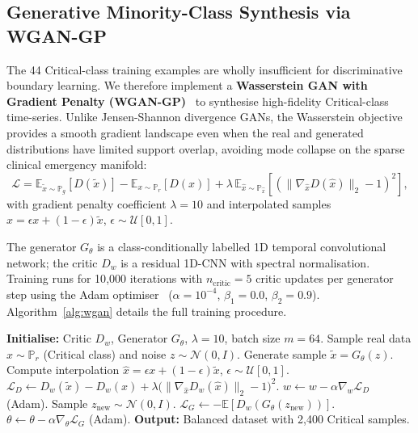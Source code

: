 \documentclass[conference]{IEEEtran}
\begin{document}
\subsection{Generative Minority-Class Synthesis via WGAN-GP}
The 44 Critical-class training examples are wholly insufficient for
discriminative boundary learning.  We therefore implement a
\textbf{Wasserstein GAN with Gradient Penalty (WGAN-GP)}~\cite{b2,b8}
to synthesise high-fidelity Critical-class time-series.  Unlike
Jensen-Shannon divergence GANs, the Wasserstein objective provides a
smooth gradient landscape even when the real and generated
distributions have limited support overlap, avoiding mode collapse on
the sparse clinical emergency manifold:
\begin{equation}
  \mathcal{L} = \mathbb{E}_{\tilde{x}\sim\mathbb{P}_g}[D(\tilde{x})]
    - \mathbb{E}_{x\sim\mathbb{P}_r}[D(x)]
    + \lambda\,\mathbb{E}_{\hat{x}\sim\mathbb{P}_{\hat{x}}}
      \!\left[\left(\|\nabla_{\hat{x}}D(\hat{x})\|_2 - 1\right)^2\right],
  \label{eq:wgan}
\end{equation}
with gradient penalty coefficient $\lambda = 10$ and interpolated
samples $\hat{x} = \epsilon x + (1-\epsilon)\tilde{x}$,
$\epsilon \sim \mathcal{U}[0,1]$.

The generator $G_\theta$ is a class-conditionally labelled 1D temporal
convolutional network; the critic $D_w$ is a residual 1D-CNN with
spectral normalisation.  Training runs for 10{,}000 iterations with
$n_\text{critic} = 5$ critic updates per generator step using the Adam
optimiser~\cite{b18} ($\alpha = 10^{-4}$, $\beta_1 = 0.0$,
$\beta_2 = 0.9$).  Algorithm~\ref{alg:wgan} details the full training
procedure.

\begin{algorithm}
\caption{WGAN-GP Training for Clinical Minority-Class Synthesis}
\label{alg:wgan}
\begin{algorithmic}[1]
\STATE \textbf{Initialise:} Critic $D_w$, Generator $G_\theta$,
       $\lambda=10$, batch size $m=64$.
    \STATE Sample real data $x \sim \mathbb{P}_r$ (Critical class)
           and noise $z \sim \mathcal{N}(0, I)$.
    \STATE Generate sample $\tilde{x} = G_\theta(z)$.
    \STATE Compute interpolation
           $\hat{x} = \epsilon x + (1{-}\epsilon)\tilde{x}$,
           $\epsilon \sim \mathcal{U}[0,1]$.
    \STATE $\mathcal{L}_D \leftarrow D_w(\tilde{x}) - D_w(x)
           + \lambda\bigl(\|\nabla_{\hat{x}}D_w(\hat{x})\|_2 - 1\bigr)^2$.
    \STATE $w \leftarrow w - \alpha\nabla_w\mathcal{L}_D$ \quad (Adam).
  \ENDFOR
  \STATE Sample $z_{\text{new}} \sim \mathcal{N}(0, I)$.
  \STATE $\mathcal{L}_G \leftarrow -\mathbb{E}[D_w(G_\theta(z_{\text{new}}))]$.
  \STATE $\theta \leftarrow \theta - \alpha\nabla_\theta\mathcal{L}_G$
         \quad (Adam).
\ENDFOR
\STATE \textbf{Output:} Balanced dataset with 2{,}400 Critical samples.
\end{algorithmic}
\end{algorithm}
\end{document}

